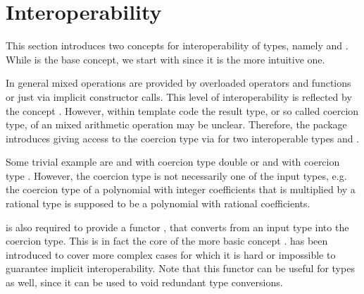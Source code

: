 \section{Interoperability}

This section introduces two concepts for interoperability of types, 
namely  and . While 
 is the base concept, we start with 
 since it is the more intuitive one.

In general mixed operations are provided by overloaded operators and
functions or just via implicit constructor calls. 
This level of interoperability is reflected by the concept 
. However, within template code the result type, 
or so called coercion type, of an mixed arithmetic operation may be unclear.
Therefore, the package introduces 
giving access to the coercion type via 
for two interoperable types  and . 


Some trivial example are  and  with coercion type double 
or  and  with coercion type .
However, the coercion type is not necessarily one of the input types,
e.g. the coercion type of a polynomial 
with integer coefficients that is multiplied by a rational type 
is supposed to be a polynomial with rational coefficients.

 is also
required to provide a functor , that 
converts from an input type into the coercion type. This is in fact the core
of the more basic concept . 
 has been introduced to cover more complex cases 
for which it is hard or impossible to guarantee implicit interoperability.  
Note that this functor can be useful for  types 
as well, since it can be used to void redundant type conversions.  

